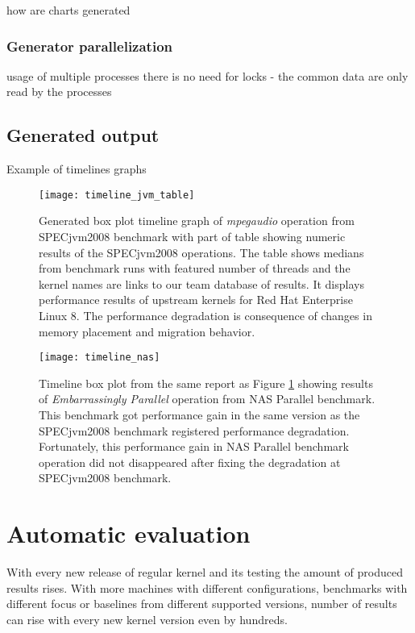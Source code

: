 how are charts generated

\subsection{Generator parallelization}
usage of multiple processes
there is no need for locks - the common data are only read by the processes

\section{Generated output}
Example of timelines graphs

\begin{figure}
  \centering
  \texttt{[image: timeline\_jvm\_table]}
  \caption{Generated box plot timeline graph of \emph{mpegaudio} operation from
    SPECjvm2008 benchmark with part of table showing numeric results of the
    SPECjvm2008 operations. The table shows medians from benchmark runs with
    featured number of threads and the kernel names are links to our team
    database of results. It displays performance results of upstream kernels for
    Red Hat Enterprise Linux 8. The performance degradation is consequence of
    changes in memory placement and migration behavior.}
  \label{fig:timeline_jvm_table}
\end{figure}

\begin{figure}
  \centering
  \texttt{[image: timeline\_nas]}
  \caption{Timeline box plot from the same report as Figure
    \ref{fig:timeline_jvm_table} showing results of \emph{Embarrassingly
    Parallel} operation from NAS Parallel benchmark. This benchmark got
    performance gain in the same version as the SPECjvm2008 benchmark registered
    performance degradation. Fortunately, this performance gain in NAS Parallel
    benchmark operation did not disappeared after fixing the degradation at
    SPECjvm2008 benchmark.}
  \label{fig:timeline_nas}
\end{figure}



\chapter{Automatic evaluation} \label{ch:ai}
With every new release of regular kernel and its testing the amount of produced
results rises. With more machines with different configurations, benchmarks with
different focus or baselines from different supported versions, number of results
can rise with every new kernel version even by hundreds.

